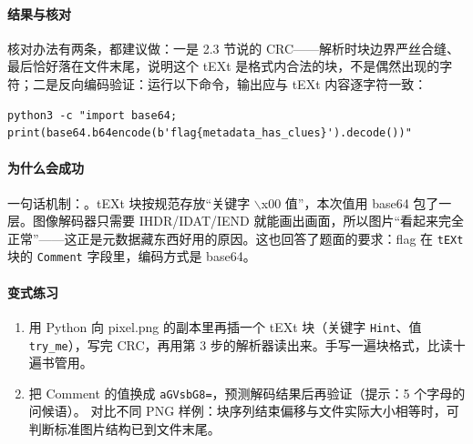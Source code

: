 \documentclass[UTF8,12pt,oneside]{ctexbook}
\begin{document}
\paragraph{结果与核对}
核对办法有两条，都建议做：一是 2.3 节说的 CRC——解析时块边界严丝合缝、最后恰好落在文件末尾，说明这个 tEXt 是格式内合法的块，不是偶然出现的字符；二是反向编码验证：运行以下命令，输出应与 tEXt 内容逐字符一致：
\begin{lstlisting}
python3 -c "import base64; print(base64.b64encode(b'flag{metadata_has_clues}').decode())"
\end{lstlisting}

\paragraph{为什么会成功}
一句话机制：。tEXt 块按规范存放“关键字 $\backslash$x00 值”，本次值用 base64 包了一层。图像解码器只需要 IHDR/IDAT/IEND 就能画出画面，所以图片“看起来完全正常”——这正是元数据藏东西好用的原因。这也回答了题面的要求：flag 在 \verb|tEXt| 块的 \verb|Comment| 字段里，编码方式是 base64。


\paragraph{变式练习}
\begin{enumerate}[label=\alph*.]
\item 用 Python 向 pixel.png 的副本里再插一个 tEXt 块（关键字 \verb|Hint|、值 \verb|try_me|），写完 CRC，再用第 3 步的解析器读出来。手写一遍块格式，比读十遍书管用。
\item 把 Comment 的值换成 \verb|aGVsbG8=|，预测解码结果后再验证（提示：5 个字母的问候语）。
对比不同 PNG 样例：块序列结束偏移与文件实际大小相等时，可判断标准图片结构已到文件末尾。
\end{enumerate}
\end{document}
